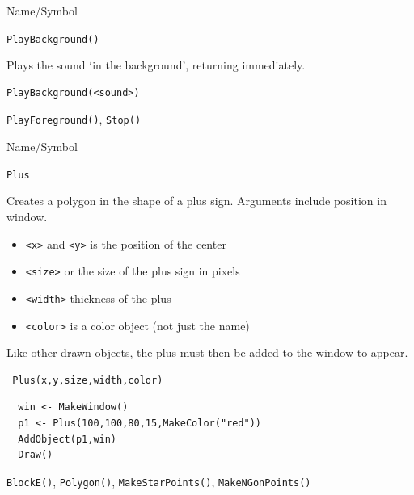 \begin{desc}{Name/Symbol}
\item[Name/Symbol]	\verb+PlayBackground()+
 
\item[Description]	Plays the sound `in the background', returning immediately.

\item[Usage]		
\begin{verbatim}
PlayBackground(<sound>)
\end{verbatim}

\item[Example]	

\item[See Also]	\verb+PlayForeground()+, \verb+Stop()+
\end{desc}


\begin{desc}{Name/Symbol}
\item[Name/Symbol]  	\verb+Plus+ 

\item[Description] Creates a polygon in the shape of a
 plus sign. Arguments include position in window.
\begin{itemize}
\item \verb+<x>+ and \verb+<y>+ is the position of the center
\item \verb+<size>+ or the size of the plus sign in pixels
\item \verb+<width>+ thickness of the plus
\item \verb+<color>+ is a color object (not just the name)
\end{itemize}

Like other drawn objects, the plus must then be added to the window
to appear.

\item[Usage]		
\begin{verbatim}
 Plus(x,y,size,width,color)
\end{verbatim}

\item[Example]	
\begin{verbatim}
  win <- MakeWindow()
  p1 <- Plus(100,100,80,15,MakeColor("red"))
  AddObject(p1,win)
  Draw()
\end{verbatim}

\item[See Also]   
\verb+BlockE()+, \verb+Polygon()+, \verb+MakeStarPoints()+,
\verb+MakeNGonPoints()+
\end{desc}

